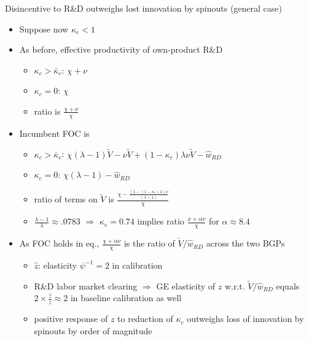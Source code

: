 \documentclass[english,usenames,dvipsnames]{beamer}
\begin{document}
\begin{frame}{Disincentive to R\&D outweighs lost innovation by spinouts (general case)}\label{disincentive_outweighs_general}
	\hyperlink{disincentive_outweighs_main}{}
	\begin{itemize}
		\footnotesize
		\item<+-> Suppose now $\kappa_e < 1$
		\item<+-> As before, effective productivity of own-product R\&D
		\begin{itemize}
			\footnotesize
			\item $\kappa_c > \bar{\kappa}_c$: $\chi + \nu$
			\item $\kappa_c = 0$: $\chi$
			\item ratio is $\frac{\chi + \nu}{\chi}$
		\end{itemize}
		\item<+-> Incumbent FOC is 
		\begin{itemize}
			\footnotesize
			\item $\kappa_c > \bar{\kappa}_c$: $\chi (\lambda - 1) \tilde{V} - \nu \tilde{V} + (1 - \kappa_e) \lambda \nu \tilde{V} - \hat{w}_{RD}$
			\item $\kappa_c = 0$: $\chi (\lambda -1) - \hat{w}_{RD}$
			\item ratio of terms on $\tilde{V}$ is $\frac{\chi - \frac{(1 - (1-\kappa_e)\lambda ) \nu }{(\lambda -1)}}{\chi}$
			\item $\frac{\lambda-1}{\lambda} \approx .0783$ $\Rightarrow$ $\kappa_e = 0.74$ implies ratio $\frac{x + \alpha \nu}{\chi}$ for $\alpha \approx 8.4$
		\end{itemize}
		\item<+-> As FOC holds in eq., $\frac{\chi + \alpha \nu}{\chi}$ is the ratio of $\tilde{V} / \hat{w}_{RD}$ across the two BGPs
		\begin{itemize}
			\footnotesize
			\item $\hat{z}$: elasticity $\psi^{-1} = 2$ in calibration
			\item R\&D labor market clearing $\Rightarrow$ GE elasticity of $z$ w.r.t. $\tilde{V}/ \hat{w}_{RD}$ equals $2 \times \frac{\hat{z}}{z} \approx 2$ in baseline calibration as well
			\item positive response of $z$ to reduction of $\kappa_c$ outweighs loss of innovation by spinouts by order of magnitude
		\end{itemize} 
	\end{itemize}
\end{frame}
\end{document}
